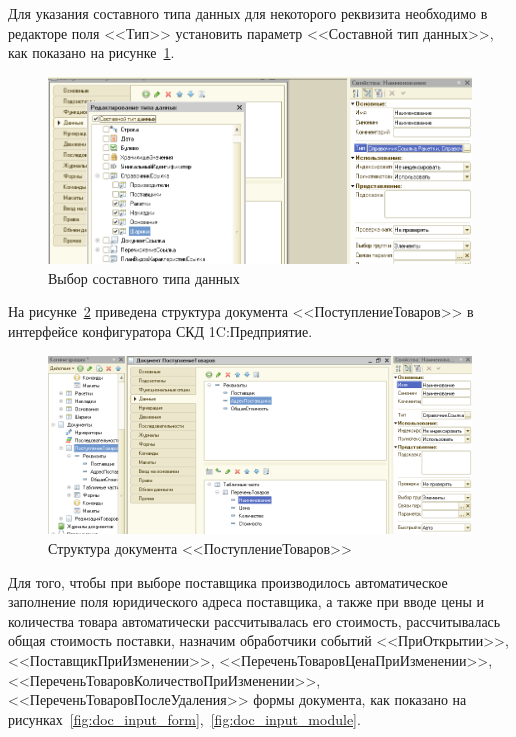 Для указания составного типа данных для некоторого реквизита необходимо в
редакторе поля <<Тип>> установить параметр <<Составной тип данных>>,
как показано на рисунке~\ref{fig:complex_type}.

\begin{figure}[h!]
  \centering
  \includegraphics[width=150mm]{pic/complex_type}
  \caption{Выбор составного типа данных}
  \label{fig:complex_type}
\end{figure}

На рисунке~\ref{fig:doc_input} приведена
структура документа <<ПоступлениеТоваров>> в интерфейсе конфигуратора
СКД 1C:Предприятие.

\begin{figure}[h!]
  \centering
  \includegraphics[width=150mm]{pic/doc_input}
  \caption{Структура документа <<ПоступлениеТоваров>>}
  \label{fig:doc_input}
\end{figure}

Для того, чтобы
при выборе поставщика производилось автоматическое заполнение
поля юридического адреса поставщика, а также
при вводе цены и количества товара автоматически
рассчитывалась его стоимость, рассчитывалась общая стоимость
поставки,
назначим обработчики событий
<<ПриОткрытии>>,
<<ПоставщикПриИзменении>>,
<<ПереченьТоваровЦенаПриИзменении>>,
<<ПереченьТоваровКоличествоПриИзменении>>,
<<ПереченьТоваровПослеУдаления>>
формы документа, как показано на
рисунках~\ref{fig:doc_input_form},~\ref{fig:doc_input_module}.


